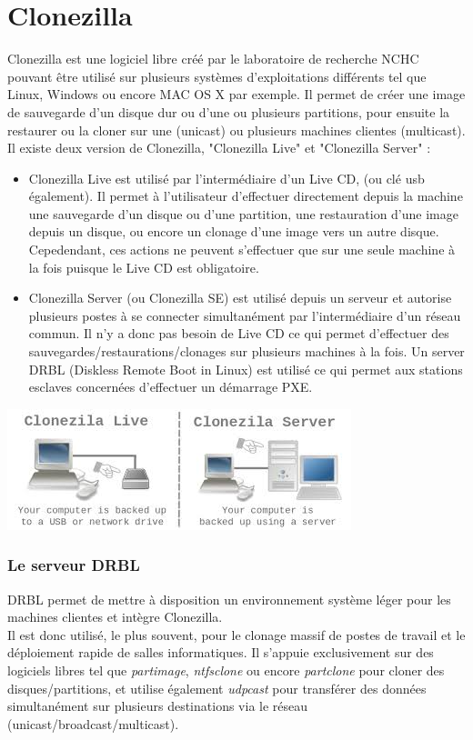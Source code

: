 \documentclass[a4paper,12pt,one side,titlepage]{report}
\begin{document}
\section{Clonezilla}
Clonezilla est une logiciel libre créé par le laboratoire de recherche NCHC pouvant être utilisé sur plusieurs systèmes d'exploitations différents tel que Linux, Windows ou encore MAC OS X par exemple. Il permet de créer une image de sauvegarde d'un disque dur ou d'une ou plusieurs partitions, pour ensuite la restaurer ou la cloner sur une (unicast) ou plusieurs machines clientes (multicast).\\
Il existe deux version de Clonezilla, "Clonezilla Live" et "Clonezilla Server" :\\
\begin{itemize}
  \item Clonezilla Live est utilisé par l'intermédiaire d'un Live CD, (ou clé usb également). Il permet à l'utilisateur d'effectuer directement depuis la machine une sauvegarde d'un disque ou d'une partition, une restauration d'une image depuis un disque, ou encore un clonage d'une image vers un autre disque. Cepedendant, ces actions ne peuvent s'effectuer que sur une seule machine à la fois puisque le Live CD est obligatoire.\\
  \item Clonezilla Server (ou Clonezilla SE) est utilisé depuis un serveur et autorise plusieurs postes à se connecter simultanément par l'intermédiaire d'un réseau commun. Il n'y a donc pas besoin de Live CD ce qui permet d'effectuer des sauvegardes/restaurations/clonages sur plusieurs machines à la fois. Un server DRBL (Diskless Remote Boot in Linux) est utilisé ce qui permet aux stations esclaves concernées d'effectuer un démarrage PXE.
\end{itemize}
\begin{center}\includegraphics[scale=0.9]{./img/clonezilla.jpeg}\end{center}
\vspace{1em}
\subsubsection{Le serveur DRBL}
DRBL permet de mettre à disposition un environnement système léger pour les machines clientes et intègre Clonezilla.\\
Il est donc utilisé, le plus souvent, pour le clonage massif de postes de travail et le déploiement rapide de salles informatiques. Il s'appuie exclusivement sur des logiciels libres tel que \textit{partimage}, \textit{ntfsclone} ou encore \textit{partclone} pour cloner des disques/partitions, et utilise également \textit{udpcast} pour transférer des données simultanément sur plusieurs destinations via le réseau (unicast/broadcast/multicast).
\end{document}
